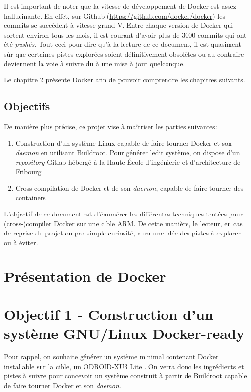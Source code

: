 \documentclass[11pt,a4paper,oneside]{report}
\newcommand{\school}{Haute École d'ingénierie et d'architecture de Fribourg }
\newcommand{\odroid}{ODROID-XU3 Lite }
\begin{document}
Il est important de noter que la vitesse de développement de Docker est assez hallucinante. En effet, sur Github (\url{https://github.com/docker/docker}) les commits se succèdent à vitesse grand V. Entre chaque version de Docker qui sortent environ tous les mois, il est courant d'avoir plus de 3000 commits qui ont été \emph{pushés}. Tout ceci pour dire qu'à la lecture de ce document, il est quasiment sûr que certaines pistes explorées soient définitivement obsolètes ou au contraire deviennent la voie à suivre du à une mise à jour quelconque.

Le chapitre \ref{pres-docker} présente Docker afin de pouvoir comprendre les chapitres suivants.


\section{Objectifs}

De manière plus précise, ce projet vise à maîtriser les parties suivantes:

\begin{enumerate}
  \item Construction d'un système Linux capable de faire tourner Docker et son \emph{daemon} en utilisant Buildroot. Pour générer ledit système, on dispose d'un \emph{repository} Gitlab hébergé à la \school

  \item Cross compilation de Docker et de son \emph{daemon}, capable de faire tourner des containers
\end{enumerate}

L'objectif de ce document est d'énumérer les différentes techniques tentées pour (cross-)compiler Docker sur une cible ARM. De cette manière, le lecteur, en cas de reprise du projet ou par simple curiosité, aura une idée des pistes à explorer ou à éviter.

\chapter{Présentation de Docker}\label{pres-docker}


\chapter{Objectif 1 - Construction d'un système GNU/Linux Docker-ready}

Pour rappel, on souhaite générer un système minimal contenant Docker installable sur la cible, un \odroid. On verra donc les ingrédients et pistes à suivre pour concevoir un système construit à partir de Buildroot capable de faire tourner Docker et son \emph{daemon}.
\end{document}
